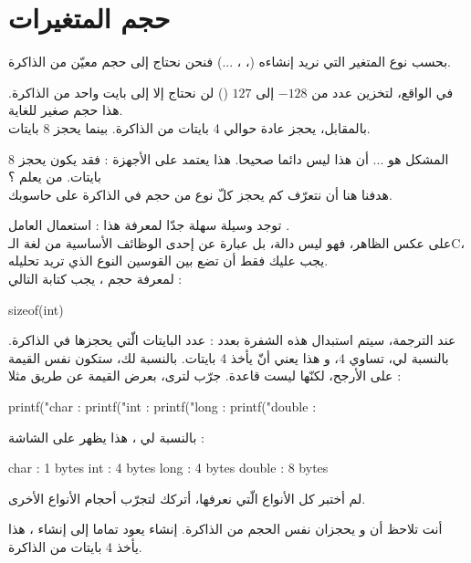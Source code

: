 \section{حجم المتغيرات}
بحسب نوع المتغير التي نريد إنشاءه
(،
،
...)
فنحن نحتاج إلى حجم معيّن من الذاكرة.

في الواقع، لتخزين عدد من
$-128$
إلى
$127$
()
لن نحتاج إلا إلى بايت واحد من الذاكرة. هذا حجم صغير للغاية.\\
بالمقابل،
يحجز عادة حوالي 4 بايتات من الذاكرة. بينما
يحجز 8 بايتات.

المشكل هو ... أن هذا ليس دائما صحيحا. هذا يعتمد على الأجهزة : فقد يكون
يحجز 8 بايتات. من يعلم ؟\\
هدفنا هنا أن نتعرّف كم يحجز كلّ نوع من حجم في الذاكرة على حاسوبك.

توجد وسيلة سهلة جدّا لمعرفة هذا : استعمال العامل
.\\
على عكس الظاهر، فهو ليس دالة، بل عبارة عن إحدى الوظائف الأساسية من لغة الـ\textenglish{C}،
يجب عليك فقط أن تضع بين القوسين النوع الذي تريد تحليله.\\
لمعرفة حجم
،
يجب كتابة التالي :

\begin{Csource}
sizeof(int)
\end{Csource}

عند الترجمة، سيتم استبدال هذه الشفرة بعدد : عدد البايتات الّتي يحجزها
في الذاكرة. بالنسبة لي،
تساوي 4، و هذا يعني أنّ
يأخذ 4 بايتات. بالنسبة لك، ستكون نفس القيمة على الأرجح، لكنّها ليست قاعدة. جرّب لترى، بعرض القيمة عن طريق
مثلا :

\begin{Csource}
printf("char : %
printf("int : %
printf("long : %
printf("double : %
\end{Csource}

بالنسبة لي ، هذا يظهر على الشاشة :

\begin{Csource}
char : 1 bytes
int : 4 bytes
long : 4 bytes
double : 8 bytes
\end{Csource}

لم أختبر كل الأنواع الّتي نعرفها، أتركك لتجرّب أحجام الأنواع الأخرى.

أنت تلاحظ أن
و
يحجزان نفس الحجم من الذاكرة. إنشاء
يعود تماما إلى إنشاء
،
هذا يأخذ 4 بايتات من الذاكرة.

